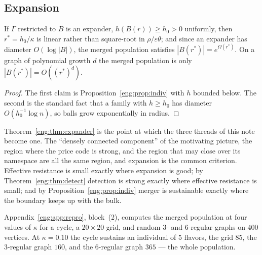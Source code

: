 \subsection{Expansion}\label{eng:S8.4}

\begin{theorem}
\label{eng:thm:expander}
If $\Gamma$ restricted to $B$ is an expander, $h(B(r)) \geq h_0 > 0$
uniformly, then $r^\ast = h_0/\kappa$ is linear rather than square-root in
$\rho/\varepsilon\theta$; and since an expander has diameter
$O(\log|B|)$, the merged population satisfies
$|B(r^\ast)| = e^{\Omega(r^\ast)}$. On a graph of polynomial growth $d$ the
merged population is only $|B(r^\ast)| = O((r^\ast)^d)$.
\end{theorem}

\begin{proof}
The first claim is Proposition~\ref{eng:prop:indiv} with $h$ bounded below.
The second is the standard fact that a family with $h \geq h_0$ has
diameter $O(h_0^{-1}\log n)$, so balls grow exponentially in radius.
\end{proof}

Theorem~\ref{eng:thm:expander} is the point at which the three threads of this
note become one. The ``densely connected component'' of the motivating
picture, the region where the price code is strong, and the region that may
close over its namespace are all the same region, and expansion is the
common criterion. Effective resistance is small exactly where expansion is
good; by Theorem~\ref{eng:thm:detect} detection is strong exactly where
effective resistance is small; and by Proposition~\ref{eng:prop:indiv} merger
is sustainable exactly where the boundary keeps up with the bulk.

Appendix~\ref{eng:app:repro}, block~(2), computes the merged population at four
values of $\kappa$ for a cycle, a $20\times 20$ grid, and random $3$- and
$6$-regular graphs on $400$ vertices. At $\kappa = 0.10$ the cycle sustains
an individual of $5$ flavors, the grid $85$, the $3$-regular graph $160$,
and the $6$-regular graph $365$ --- the whole population.

